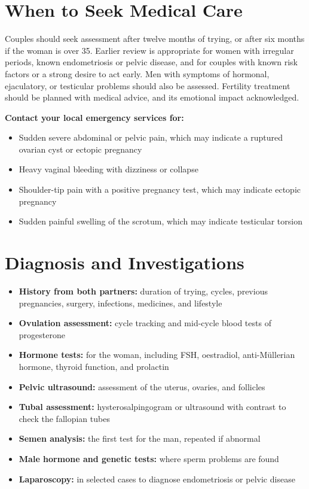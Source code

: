 \section*{When to Seek Medical Care}
Couples should seek assessment after twelve months of trying, or after six months if the woman is over 35. Earlier review is appropriate for women with irregular periods, known endometriosis or pelvic disease, and for couples with known risk factors or a strong desire to act early. Men with symptoms of hormonal, ejaculatory, or testicular problems should also be assessed. Fertility treatment should be planned with medical advice, and its emotional impact acknowledged.

\textbf{Contact your local emergency services for:}
\begin{itemize}
    \item Sudden severe abdominal or pelvic pain, which may indicate a ruptured ovarian cyst or ectopic pregnancy
    \item Heavy vaginal bleeding with dizziness or collapse
    \item Shoulder-tip pain with a positive pregnancy test, which may indicate ectopic pregnancy
    \item Sudden painful swelling of the scrotum, which may indicate testicular torsion
\end{itemize}

\section*{Diagnosis and Investigations}
\begin{itemize}
    \item \textbf{History from both partners:} duration of trying, cycles, previous pregnancies, surgery, infections, medicines, and lifestyle
    \item \textbf{Ovulation assessment:} cycle tracking and mid-cycle blood tests of progesterone
    \item \textbf{Hormone tests:} for the woman, including FSH, oestradiol, anti-Müllerian hormone, thyroid function, and prolactin
    \item \textbf{Pelvic ultrasound:} assessment of the uterus, ovaries, and follicles
    \item \textbf{Tubal assessment:} hysterosalpingogram or ultrasound with contrast to check the fallopian tubes
    \item \textbf{Semen analysis:} the first test for the man, repeated if abnormal
    \item \textbf{Male hormone and genetic tests:} where sperm problems are found
    \item \textbf{Laparoscopy:} in selected cases to diagnose endometriosis or pelvic disease
\end{itemize}

